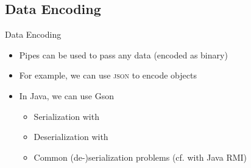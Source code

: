 {\begin{cut-from-main}
\subsection{Data Encoding}
\begin{frame}[fragile]{Data Encoding}
   \begin{itemize}[<+(1)->]
      \itemsep12pt
      \item Pipes can be used to pass any data (encoded as binary)
      \item For example, we can use \textsc{json} to encode objects
      \item In Java, we can use Gson \begin{itemize}
         \itemsep2pt
         \item Serialization with 
         \item Deserialization with 
         \item Common (de-)serialization problems (cf.  with Java RMI) %
      \end{itemize}
   \end{itemize}
\end{frame}
\SidebarReset
\end{cut-from-main}
}

